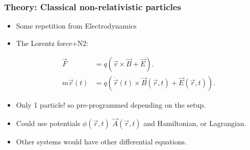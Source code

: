 \documentclass{beamer}
\begin{document}
\begin{frame}
\frametitle{Theory: Classical non-relativistic particles}
\begin{itemize}
\item<1-> Some repetition from Electrodynamics
\item<2-> The Lorentz force+N2:

\begin{align*}
\vec{F} &= q ( \vec{v}\times \vec{B}+\vec{E}).\\
m \ddot{\vec{r}}(t) &= q ( \dot{\vec{r}}(t)\times \vec{B}(\vec{r},t)+\vec{E}(\vec{r},t)).
\end{align*}

\item<3-> Only 1 particle! so pre-programmed depending on the setup.

\item<4-> Could use potentials $\phi(\vec{r},t)$ $\vec{A}(\vec{r},t)$ and Hamiltonian, or Lagrangian.

\item<4-> Other systems would have other differential equations.

\end{itemize}
\end{frame}
\end{document}
